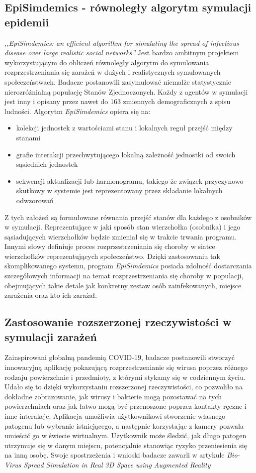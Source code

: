 \subsection{\textbf{EpiSimdemics - równoległy algorytm symulacji epidemii}}
\textit{,,EpiSimdemics: an efficient algorithm for simulating the spread of infectious disease over large realistic social networks''} \cite{bib:konferencja} Jest bardzo ambitnym projektem wykorzystującym do obliczeń równoległy algorytm do symulowania rozprzestrzeniania się zarażeń w dużych i realistycznych symulowanych społeczeństwach. Badacze postanowili zasymulować niemalże statystycznie nierozróżnialną populację Stanów Zjednoczonych. Każdy z agentów w symulacji jest inny i opisany przez nawet do 163 zmiennych demograficznych z spisu ludności. Algorytm \textit{EpiSimdemics} opiera się na:
\begin{itemize}
	\item kolekcji jednostek z wartościami stanu i lokalnych reguł przejść między stanami
	\item grafie interakcji przechwytującego lokalną zależność jednostki od swoich sąsiednich jednostek
	\item sekwencji aktualizacji lub harmonogramu, takiego że związek przyczynowo-skutkowy w systemie jest 	reprezentowany przez składanie lokalnych odwzorowań
\end{itemize}
Z tych założeń są formułowane równania przejść stanów dla każdego z osobników w symulacji. Reprezentujące w jaki sposób stan wierzchołka (osobnika) i jego sąsiadujących wierzchołków będzie zmieniał się w trakcie trwania programu. Innymi słowy definiuje proces rozprzestrzeniania się choroby w siatce wierzchołków reprezentujących społeczeństwo.
	Dzięki zastosowaniu tak skomplikowanego systemu, program \textit{EpiSimdemics} posiada zdolność dostarczania szczegółowych informacji na temat rozprzestrzeniania się choroby w populacji, obejmujących takie detale jak konkretny zestaw osób zainfekowanych, miejsce zarażenia oraz kto ich zarażał.
\subsection{\textbf{Zastosowanie rozszerzonej rzeczywistości w symulacji zarażeń}}

Zainspirowani globalną pandemią COVID-19, badacze postanowili stworzyć innowacyjną aplikację pokazującą rozprzestrzenianie się wirusa poprzez różnego rodzaju powierzchnie i przedmioty, z którymi stykamy się w codziennym życiu. Udało się to dzięki wykorzystaniu rozszerzonej rzeczywistości, co pozwoliło na dokładne zobrazowanie, jak wirusy i bakterie mogą pozostawać na tych powierzchniach oraz jak łatwo mogą być przenoszone poprzez kontakty ręczne i inne interakcje. Aplikacja umożliwia użytkownikowi stworzenie własnego patogenu lub wybranie istniejącego, a następnie korzystając z kamery pozwala umieścić go w świecie wirtualnym. Użytkownik może śledzić, jak długo patogen utrzymuje się w danym miejscu, potencjalnie stanowiąc ryzyko przeniesienia się na inną osobę. Swoje spostrzeżenia i wnioski badacze zawarli w artykule \textit{Bio-Virus Spread Simulation in Real 3D Space using Augmented Reality}\cite{bib:artykul2}

